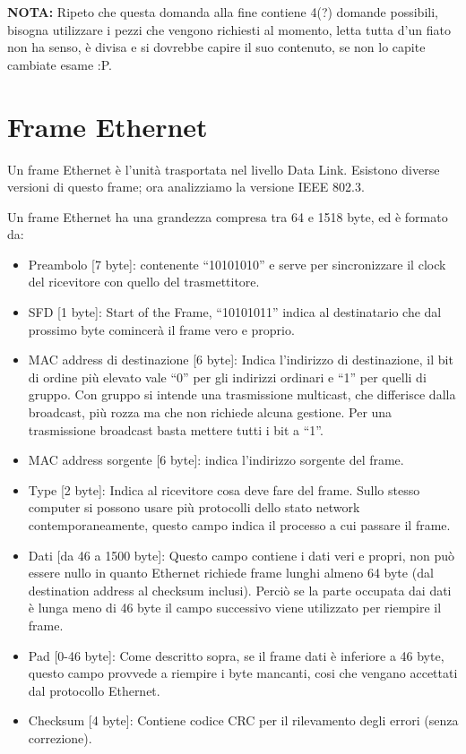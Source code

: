 \textbf{NOTA:} Ripeto che questa domanda alla fine contiene 4(?) domande possibili, bisogna utilizzare i pezzi che vengono richiesti al momento, letta tutta d’un fiato non ha senso, è divisa e si dovrebbe capire il suo contenuto, se non lo capite cambiate esame :P.

\section{Frame Ethernet}

Un frame Ethernet è l’unità trasportata nel livello Data Link.
Esistono diverse versioni di questo frame; ora analizziamo la versione IEEE 802.3. 

Un frame Ethernet ha una grandezza compresa tra 64 e 1518 byte, ed è formato da:
\begin{itemize}
\item	Preambolo [7 byte]: contenente “10101010” e serve per sincronizzare il clock del ricevitore con quello del trasmettitore.
\item	SFD [1 byte]: Start of the Frame, “10101011” indica al destinatario che dal prossimo byte comincerà il frame vero e proprio.
\item	MAC address di destinazione [6 byte]: Indica l’indirizzo di destinazione, il bit di ordine più elevato vale “0” per gli indirizzi ordinari e “1” per quelli di gruppo. Con gruppo si intende una trasmissione multicast, che differisce dalla broadcast, più rozza ma che non richiede alcuna gestione. Per una trasmissione broadcast basta mettere tutti i bit a “1”.
\item	MAC address sorgente [6 byte]: indica l’indirizzo sorgente del frame.
\item	Type [2 byte]: Indica al ricevitore cosa deve fare del frame. Sullo stesso computer si possono usare più protocolli dello stato network contemporaneamente, questo campo indica il processo a cui passare il frame.
\item	Dati [da 46 a 1500 byte]: Questo campo contiene i dati veri e propri, non può essere nullo in quanto Ethernet richiede frame lunghi almeno 64 byte (dal destination address al checksum inclusi). Perciò se la parte occupata dai dati è lunga meno di 46 byte il campo successivo viene utilizzato per riempire il frame.
\item	Pad [0-46 byte]: Come descritto sopra, se il frame dati è inferiore a 46 byte, questo campo provvede a riempire i byte mancanti, cosi che vengano accettati dal protocollo Ethernet.
\item	Checksum [4 byte]: Contiene codice CRC per il rilevamento degli errori (senza correzione).
\end{itemize}

